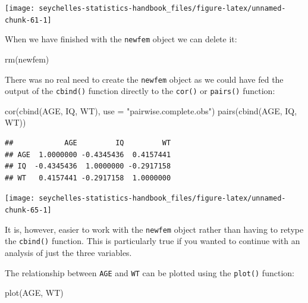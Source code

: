 \documentclass[
  12pt,
]{book}
\newenvironment{Shaded}{\begin{snugshade}}{\end{snugshade}}
\newcommand{\AttributeTok}[1]{\textcolor[rgb]{0.77,0.63,0.00}{#1}}
\newcommand{\FunctionTok}[1]{\textcolor[rgb]{0.00,0.00,0.00}{#1}}
\newcommand{\NormalTok}[1]{#1}
\newcommand{\StringTok}[1]{\textcolor[rgb]{0.31,0.60,0.02}{#1}}
\begin{document}
\newpage

\begin{center}\texttt{[image: seychelles-statistics-handbook\_files/figure-latex/unnamed-chunk-61-1]} \end{center}

When we have finished with the \texttt{newfem} object we can delete it:

\begin{Shaded}
\begin{Highlighting}[]
\FunctionTok{rm}\NormalTok{(newfem)}
\end{Highlighting}
\end{Shaded}

There was no real need to create the \texttt{newfem} object as we could have fed the output of the \texttt{cbind()} function directly to the \texttt{cor()} or \texttt{pairs()} function:

\begin{Shaded}
\begin{Highlighting}[]
\FunctionTok{cor}\NormalTok{(}\FunctionTok{cbind}\NormalTok{(AGE, IQ, WT), }\AttributeTok{use =} \StringTok{"pairwise.complete.obs"}\NormalTok{)}
\FunctionTok{pairs}\NormalTok{(}\FunctionTok{cbind}\NormalTok{(AGE, IQ, WT))}
\end{Highlighting}
\end{Shaded}

\begin{verbatim}
##            AGE         IQ         WT
## AGE  1.0000000 -0.4345436  0.4157441
## IQ  -0.4345436  1.0000000 -0.2917158
## WT   0.4157441 -0.2917158  1.0000000
\end{verbatim}

\newpage

\begin{center}\texttt{[image: seychelles-statistics-handbook\_files/figure-latex/unnamed-chunk-65-1]} \end{center}

It is, however, easier to work with the \texttt{newfem} object rather than having to retype the \texttt{cbind()} function. This is particularly true if you wanted to continue with an analysis of just the three variables.

The relationship between \texttt{AGE} and \texttt{WT} can be plotted using the \texttt{plot()} function:

\begin{Shaded}
\begin{Highlighting}[]
\FunctionTok{plot}\NormalTok{(AGE, WT)}
\end{Highlighting}
\end{Shaded}
\end{document}
